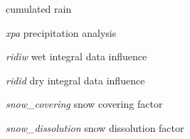 \begin{DoxyItemize}
\begin{DoxyItemize}
\begin{DoxyEnumerate}
\end{DoxyEnumerate}
\item cumulated rain 
\begin{DoxyEnumerate}
\item {\itshape xpa} precipitation analysis 
\item {\itshape ridiw} wet integral data influence 
\item {\itshape ridid} dry integral data influence 
\item {\itshape snow\-\_\-covering} snow covering factor 
\item {\itshape snow\-\_\-dissolution} snow dissolution factor 
\end{DoxyEnumerate}
\end{DoxyItemize}
\end{DoxyItemize}